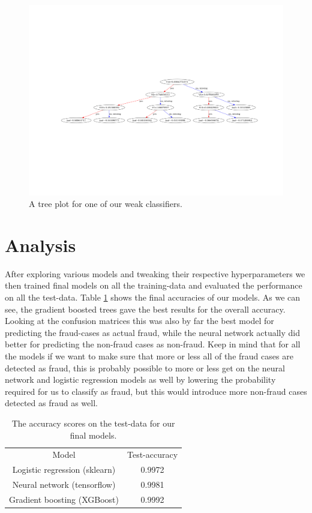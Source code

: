 \documentclass{article}
\begin{document}
\begin{figure}
	\centering
	\includegraphics[scale=0.8]{xgb_final_tree_plot}
	\caption{A tree plot for one of our weak classifiers.}
	\label{xgbtreeplot}
\end{figure}

\section{Analysis}
After exploring various models and tweaking their respective hyperparameters we
then trained final models on all the training-data and evaluated the
performance on all the test-data. Table \ref{finalmodelscomparison} shows the
final accuracies of our models. As we can see, the gradient boosted trees gave
the best results for the overall accuracy. Looking at the confusion matrices
this was also by far the best model for predicting the fraud-cases as actual
fraud, while the neural network actually did better for predicting the non-fraud
cases as non-fraud. Keep in mind that for all the models if we want to make sure
that more or less all of the fraud cases are detected as fraud, this is probably
possible to more or less get on the neural network and logistic regression
models as well by lowering the probability required for us to classify as fraud,
but this would introduce more non-fraud cases detected as fraud as well.
\begin{table}
	\centering
	\begin{tabular}{| c | c |}
		Model                         & Test-accuracy \\
		Logistic regression (sklearn) & 0.9972        \\
		Neural network (tensorflow)   & 0.9981        \\
		Gradient boosting (XGBoost)   & 0.9992
	\end{tabular}
	\caption{The accuracy scores on the test-data for our final models.}
	\label{finalmodelscomparison}
\end{table}
\end{document}
